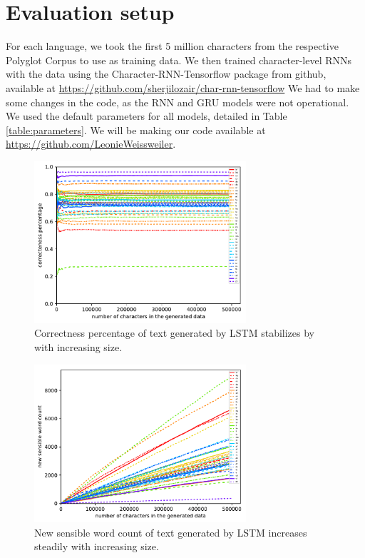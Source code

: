 \documentclass[11pt,a4paper,twoside,openright]{scrbook}
\begin{document}
\section{Evaluation setup}
For each language, we took the first 5 million characters from the respective Polyglot Corpus to use as training data. We then trained character-level RNNs with the data using the Character-RNN-Tensorflow package from github, available at \href{url}{https://github.com/sherjilozair/char-rnn-tensorflow} We had to make some changes in the code, as the RNN and GRU models were not operational. We used the default parameters for all models, detailed in Table \ref{table:parameters}. We will be making our code available at \href{url}{https://github.com/LeonieWeissweiler}. 

\begin{figure}
\centering
\includegraphics[width=0.7\textwidth]{graphs/lstm/gen_char_token_performance}
\caption{Correctness percentage of text generated by LSTM stabilizes by with increasing size.}
\label{Figure:lstm_gen_char_token_performance}
\end{figure}


\begin{figure}
\centering
\includegraphics[width=0.7\textwidth]{graphs/lstm/gen_char_type_performance}
\caption{New sensible word count of text generated by LSTM increases steadily with increasing size.}
\label{Figure:lstm_gen_char_type_performance}
\end{figure}
\end{document}
